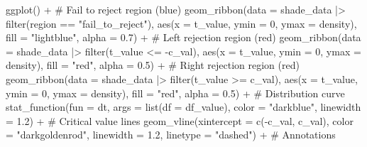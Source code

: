 \documentclass[
  letterpaper,
  DIV=11,
  numbers=noendperiod]{scrreprt}
\newenvironment{Shaded}{\begin{snugshade}}{\end{snugshade}}
\newcommand{\AttributeTok}[1]{\textcolor[rgb]{0.40,0.45,0.13}{#1}}
\newcommand{\CommentTok}[1]{\textcolor[rgb]{0.37,0.37,0.37}{#1}}
\newcommand{\DecValTok}[1]{\textcolor[rgb]{0.68,0.00,0.00}{#1}}
\newcommand{\FloatTok}[1]{\textcolor[rgb]{0.68,0.00,0.00}{#1}}
\newcommand{\FunctionTok}[1]{\textcolor[rgb]{0.28,0.35,0.67}{#1}}
\newcommand{\NormalTok}[1]{\textcolor[rgb]{0.00,0.23,0.31}{#1}}
\newcommand{\SpecialCharTok}[1]{\textcolor[rgb]{0.37,0.37,0.37}{#1}}
\newcommand{\StringTok}[1]{\textcolor[rgb]{0.13,0.47,0.30}{#1}}
\begin{document}
\begin{Shaded}
\begin{Highlighting}[]
\FunctionTok{ggplot}\NormalTok{() }\SpecialCharTok{+}
  \CommentTok{\# Fail to reject region (blue)}
  \FunctionTok{geom\_ribbon}\NormalTok{(}\AttributeTok{data =}\NormalTok{ shade\_data }\SpecialCharTok{|\textgreater{}} \FunctionTok{filter}\NormalTok{(region }\SpecialCharTok{==} \StringTok{"fail\_to\_reject"}\NormalTok{),}
              \FunctionTok{aes}\NormalTok{(}\AttributeTok{x =}\NormalTok{ t\_value, }\AttributeTok{ymin =} \DecValTok{0}\NormalTok{, }\AttributeTok{ymax =}\NormalTok{ density),}
              \AttributeTok{fill =} \StringTok{"lightblue"}\NormalTok{, }\AttributeTok{alpha =} \FloatTok{0.7}\NormalTok{) }\SpecialCharTok{+}
  \CommentTok{\# Left rejection region (red)}
  \FunctionTok{geom\_ribbon}\NormalTok{(}\AttributeTok{data =}\NormalTok{ shade\_data }\SpecialCharTok{|\textgreater{}} \FunctionTok{filter}\NormalTok{(t\_value }\SpecialCharTok{\textless{}=} \SpecialCharTok{{-}}\NormalTok{c\_val),}
              \FunctionTok{aes}\NormalTok{(}\AttributeTok{x =}\NormalTok{ t\_value, }\AttributeTok{ymin =} \DecValTok{0}\NormalTok{, }\AttributeTok{ymax =}\NormalTok{ density),}
              \AttributeTok{fill =} \StringTok{"red"}\NormalTok{, }\AttributeTok{alpha =} \FloatTok{0.5}\NormalTok{) }\SpecialCharTok{+}
  \CommentTok{\# Right rejection region (red)}
  \FunctionTok{geom\_ribbon}\NormalTok{(}\AttributeTok{data =}\NormalTok{ shade\_data }\SpecialCharTok{|\textgreater{}} \FunctionTok{filter}\NormalTok{(t\_value }\SpecialCharTok{\textgreater{}=}\NormalTok{ c\_val),}
              \FunctionTok{aes}\NormalTok{(}\AttributeTok{x =}\NormalTok{ t\_value, }\AttributeTok{ymin =} \DecValTok{0}\NormalTok{, }\AttributeTok{ymax =}\NormalTok{ density),}
              \AttributeTok{fill =} \StringTok{"red"}\NormalTok{, }\AttributeTok{alpha =} \FloatTok{0.5}\NormalTok{) }\SpecialCharTok{+}
  \CommentTok{\# Distribution curve}
  \FunctionTok{stat\_function}\NormalTok{(}\AttributeTok{fun =}\NormalTok{ dt, }\AttributeTok{args =} \FunctionTok{list}\NormalTok{(}\AttributeTok{df =}\NormalTok{ df\_value),}
                \AttributeTok{color =} \StringTok{"darkblue"}\NormalTok{, }\AttributeTok{linewidth =} \FloatTok{1.2}\NormalTok{) }\SpecialCharTok{+}
  \CommentTok{\# Critical value lines}
  \FunctionTok{geom\_vline}\NormalTok{(}\AttributeTok{xintercept =} \FunctionTok{c}\NormalTok{(}\SpecialCharTok{{-}}\NormalTok{c\_val, c\_val),}
             \AttributeTok{color =} \StringTok{"darkgoldenrod"}\NormalTok{, }\AttributeTok{linewidth =} \FloatTok{1.2}\NormalTok{, }\AttributeTok{linetype =} \StringTok{"dashed"}\NormalTok{) }\SpecialCharTok{+}
  \CommentTok{\# Annotations}

\end{Highlighting}
\end{Shaded}
\end{document}
